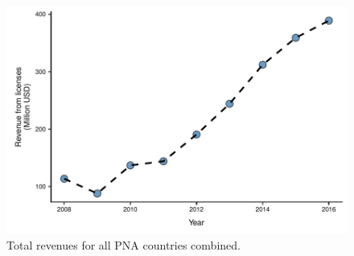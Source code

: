 \documentclass[12pt]{article}
\begin{document}
\begin{figure}
\centering
	\includegraphics{img/total_PNA_revenues.pdf}
	\caption{\label{fig:total_PNA_revenues}Total revenues for all PNA countries combined.}
\end{figure}
\end{document}
